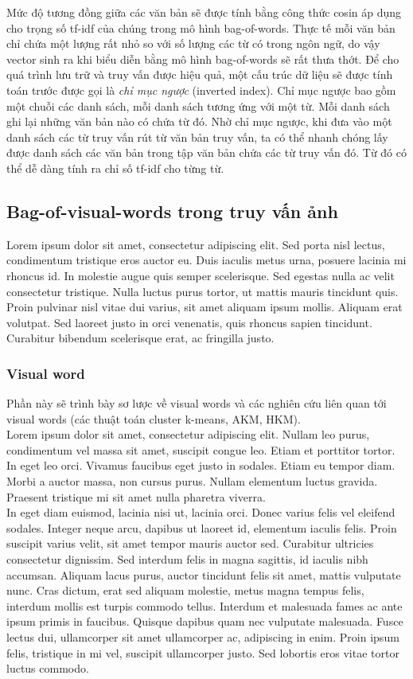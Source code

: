 Mức độ tương đồng giữa các văn bản sẽ được tính bằng công thức cosin áp dụng cho trọng số tf-idf của chúng trong mô hình bag-of-words. Thực tế mỗi văn bản chỉ chứa một lượng rất nhỏ so với số lượng các từ có trong ngôn ngữ, do vậy vector sinh ra khi biểu diễn bằng mô hình bag-of-words sẽ rất thưa thớt. Để cho quá trình lưu trữ và truy vấn được hiệu quả, một cấu trúc dữ liệu sẽ được tính toán trước được gọi là \textit{chỉ mục ngược} (inverted index). Chỉ mục ngược bao gồm một chuỗi các danh sách, mỗi danh sách tương ứng với một từ. Mỗi danh sách ghi lại những văn bản nào có chứa từ đó. Nhờ chỉ mục ngược, khi đưa vào một danh sách các từ truy vấn rút từ văn bản truy vấn, ta có thể nhanh chóng lấy được danh sách các văn bản trong tập văn bản chứa các từ truy vấn đó. Từ đó có thể dễ dàng tính ra chỉ số tf-idf cho từng từ.

\subsection{Bag-of-visual-words trong truy vấn ảnh}
Lorem ipsum dolor sit amet, consectetur adipiscing elit. Sed porta nisl lectus, condimentum tristique eros auctor eu. Duis iaculis metus urna, posuere lacinia mi rhoncus id. In molestie augue quis semper scelerisque. Sed egestas nulla ac velit consectetur tristique. Nulla luctus purus tortor, ut mattis mauris tincidunt quis. Proin pulvinar nisl vitae dui varius, sit amet aliquam ipsum mollis. Aliquam erat volutpat. Sed laoreet justo in orci venenatis, quis rhoncus sapien tincidunt. Curabitur bibendum scelerisque erat, ac fringilla justo.\\
   \subsubsection{Visual word}
   
   Phần này sẽ trình bày sơ lược về visual words và các nghiên cứu liên quan tới visual words (các thuật toán cluster k-means, AKM, HKM).\\
Lorem ipsum dolor sit amet, consectetur adipiscing elit. Nullam leo purus, condimentum vel massa sit amet, suscipit congue leo. Etiam et porttitor tortor. In eget leo orci. Vivamus faucibus eget justo in sodales. Etiam eu tempor diam. Morbi a auctor massa, non cursus purus. Nullam elementum luctus gravida. Praesent tristique mi sit amet nulla pharetra viverra.\\

In eget diam euismod, lacinia nisi ut, lacinia orci. Donec varius felis vel eleifend sodales. Integer neque arcu, dapibus ut laoreet id, elementum iaculis felis. Proin suscipit varius velit, sit amet tempor mauris auctor sed. Curabitur ultricies consectetur dignissim. Sed interdum felis in magna sagittis, id iaculis nibh accumsan. Aliquam lacus purus, auctor tincidunt felis sit amet, mattis vulputate nunc. Cras dictum, erat sed aliquam molestie, metus magna tempus felis, interdum mollis est turpis commodo tellus. Interdum et malesuada fames ac ante ipsum primis in faucibus. Quisque dapibus quam nec vulputate malesuada. Fusce lectus dui, ullamcorper sit amet ullamcorper ac, adipiscing in enim. Proin ipsum felis, tristique in mi vel, suscipit ullamcorper justo. Sed lobortis eros vitae tortor luctus commodo.\\
